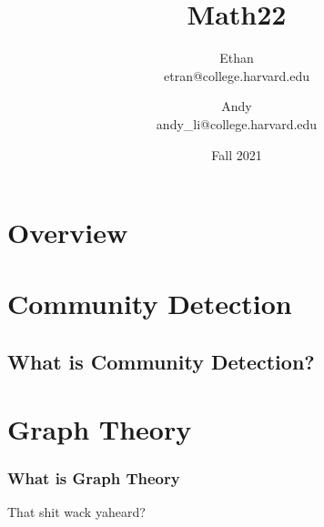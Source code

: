 \documentclass{article}
\title{Math22}
\date{Fall 2021}
\author{Ethan \\ etran@college.harvard.edu \and Andy \\ andy_li@college.harvard.edu}
\begin{document}
\pagebreak

\tableofcontents

\section{Overview}

\section{Community Detection}

\subsection{What is Community Detection?}

\section{Graph Theory}

\subsubsection{What is Graph Theory}

That shit wack yaheard?

\section{}
\end{document}
